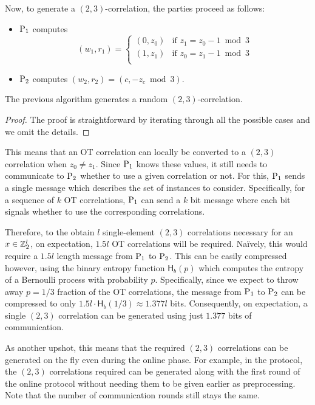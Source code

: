 Now, to generate a $(2,3)$-correlation, the parties proceed as follows:
\begin{itemize}
  \item $\textnormal{P}_1$ computes
  \[ (w_1, r_1) = 
  \begin{cases} 
      (0, z_0) & \text{if } z_1=z_0-1 \bmod 3 \\
      (1, z_1) & \text{if } z_0=z_1-1 \bmod 3 \\
   \end{cases}
  \]
  \item $\textnormal{P}_2$ computes $(w_2, r_2) = (c, -z_c \bmod 3)$.
\end{itemize}
\begin{lemma}
  The previous algorithm generates a random $(2,3)$-correlation.
\end{lemma}
\begin{proof}
The proof is straightforward by iterating through all the possible cases and we omit the details.
\end{proof}

This means that an OT correlation can locally be converted to a $(2,3)$ correlation when $z_0 \neq z_1$. Since $\textnormal{P}_1$ knows these values, it still needs to communicate to $\textnormal{P}_2$ whether to use a given correlation or not. 
For this, $\textnormal{P}_1$ sends a single message which describes the set of instances to consider. Specifically, for a sequence of $k$ OT correlations, $\textnormal{P}_1$ can send a $k$ bit message where each bit signals whether to use the corresponding correlations. 

Therefore, to the obtain $l$ single-element $(2,3)$ correlations necessary for an $x \in \mathbb{Z}_2^l$, on expectation, $1.5l$ OT correlations will be required. Na{\"i}vely, this would require a $1.5l$ length message from $\textnormal{P}_1$ to $\textnormal{P}_2$. This can be easily compressed however, using the binary entropy function $\textsf{H}_b(p)$ which computes the entropy of a Bernoulli process with probability $p$. Specifically, since we expect to throw away $p = 1/3$ fraction of the OT correlations, the message from $\textnormal{P}_1$ to $\textnormal{P}_2$ can be compressed to only $1.5l \cdot \textsf{H}_b(1/3) \approx 1.377l$ bits. Consequently, on expectation, a single $(2,3)$ correlation can be generated using just $1.377$ bits of communication.

As another upshot, this means that the required $(2,3)$ correlations can be generated on the fly even during the online phase. For example, in the \ttwPRF protocol, the $(2,3)$ correlations required can be generated along with the first round of the online protocol without needing them to be given earlier as preprocessing. Note that the number of communication rounds still stays the same.


